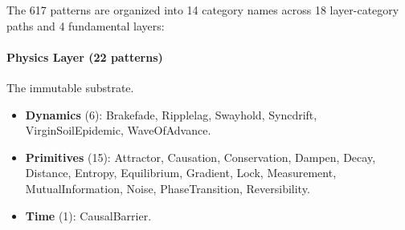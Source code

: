 The 617 patterns are organized into 14 category names across 18 layer-category paths and 4 fundamental layers:

\paragraph{Physics Layer (22 patterns)} The immutable substrate.
\begin{itemize}
    \item \textbf{Dynamics} (6): Brakefade, Ripplelag, Swayhold, Syncdrift, VirginSoilEpidemic, WaveOfAdvance.
    \item \textbf{Primitives} (15): Attractor, Causation, Conservation, Dampen, Decay, Distance, Entropy, Equilibrium, Gradient, Lock, Measurement, MutualInformation, Noise, PhaseTransition, Reversibility.
    \item \textbf{Time} (1): CausalBarrier.
\end{itemize}


